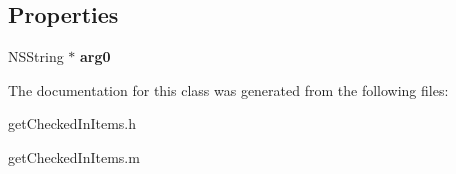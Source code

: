 \subsection*{Properties}
\begin{DoxyCompactItemize}
\item 
\hypertarget{interfaceget_checked_in_items_acd992a8f64baae682d339221b5c5376a}{}N\+S\+String $\ast$ {\bfseries arg0}\label{interfaceget_checked_in_items_acd992a8f64baae682d339221b5c5376a}

\end{DoxyCompactItemize}


The documentation for this class was generated from the following files\+:\begin{DoxyCompactItemize}
\item 
get\+Checked\+In\+Items.\+h\item 
get\+Checked\+In\+Items.\+m\end{DoxyCompactItemize}
